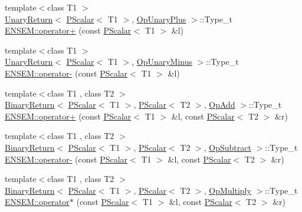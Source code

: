 \begin{DoxyCompactItemize}
\item 
{\footnotesize template$<$class T1 $>$ }\\\mbox{\hyperlink{structENSEM_1_1UnaryReturn}{Unary\+Return}}$<$ \mbox{\hyperlink{classENSEM_1_1PScalar}{P\+Scalar}}$<$ T1 $>$, \mbox{\hyperlink{structENSEM_1_1OpUnaryPlus}{Op\+Unary\+Plus}} $>$\+::Type\+\_\+t \mbox{\hyperlink{group__primscalar_ga507ae93c4b44a876ae4bf65b02462270}{E\+N\+S\+E\+M\+::operator+}} (const \mbox{\hyperlink{classENSEM_1_1PScalar}{P\+Scalar}}$<$ T1 $>$ \&l)
\item 
{\footnotesize template$<$class T1 $>$ }\\\mbox{\hyperlink{structENSEM_1_1UnaryReturn}{Unary\+Return}}$<$ \mbox{\hyperlink{classENSEM_1_1PScalar}{P\+Scalar}}$<$ T1 $>$, \mbox{\hyperlink{structENSEM_1_1OpUnaryMinus}{Op\+Unary\+Minus}} $>$\+::Type\+\_\+t \mbox{\hyperlink{group__primscalar_ga827ddd79e3c1d2cd23eb9712523df1c9}{E\+N\+S\+E\+M\+::operator-\/}} (const \mbox{\hyperlink{classENSEM_1_1PScalar}{P\+Scalar}}$<$ T1 $>$ \&l)
\item 
{\footnotesize template$<$class T1 , class T2 $>$ }\\\mbox{\hyperlink{structENSEM_1_1BinaryReturn}{Binary\+Return}}$<$ \mbox{\hyperlink{classENSEM_1_1PScalar}{P\+Scalar}}$<$ T1 $>$, \mbox{\hyperlink{classENSEM_1_1PScalar}{P\+Scalar}}$<$ T2 $>$, \mbox{\hyperlink{structENSEM_1_1OpAdd}{Op\+Add}} $>$\+::Type\+\_\+t \mbox{\hyperlink{group__primscalar_ga6cdeef7aca88574749d835692921d6e6}{E\+N\+S\+E\+M\+::operator+}} (const \mbox{\hyperlink{classENSEM_1_1PScalar}{P\+Scalar}}$<$ T1 $>$ \&l, const \mbox{\hyperlink{classENSEM_1_1PScalar}{P\+Scalar}}$<$ T2 $>$ \&r)
\item 
{\footnotesize template$<$class T1 , class T2 $>$ }\\\mbox{\hyperlink{structENSEM_1_1BinaryReturn}{Binary\+Return}}$<$ \mbox{\hyperlink{classENSEM_1_1PScalar}{P\+Scalar}}$<$ T1 $>$, \mbox{\hyperlink{classENSEM_1_1PScalar}{P\+Scalar}}$<$ T2 $>$, \mbox{\hyperlink{structENSEM_1_1OpSubtract}{Op\+Subtract}} $>$\+::Type\+\_\+t \mbox{\hyperlink{group__primscalar_gad6a80202334f9602e241a71a58828d69}{E\+N\+S\+E\+M\+::operator-\/}} (const \mbox{\hyperlink{classENSEM_1_1PScalar}{P\+Scalar}}$<$ T1 $>$ \&l, const \mbox{\hyperlink{classENSEM_1_1PScalar}{P\+Scalar}}$<$ T2 $>$ \&r)
\item 
{\footnotesize template$<$class T1 , class T2 $>$ }\\\mbox{\hyperlink{structENSEM_1_1BinaryReturn}{Binary\+Return}}$<$ \mbox{\hyperlink{classENSEM_1_1PScalar}{P\+Scalar}}$<$ T1 $>$, \mbox{\hyperlink{classENSEM_1_1PScalar}{P\+Scalar}}$<$ T2 $>$, \mbox{\hyperlink{structENSEM_1_1OpMultiply}{Op\+Multiply}} $>$\+::Type\+\_\+t \mbox{\hyperlink{group__primscalar_ga73b8e82a534a7eb469fb90a9e25271df}{E\+N\+S\+E\+M\+::operator$\ast$}} (const \mbox{\hyperlink{classENSEM_1_1PScalar}{P\+Scalar}}$<$ T1 $>$ \&l, const \mbox{\hyperlink{classENSEM_1_1PScalar}{P\+Scalar}}$<$ T2 $>$ \&r)

\end{DoxyCompactItemize}

